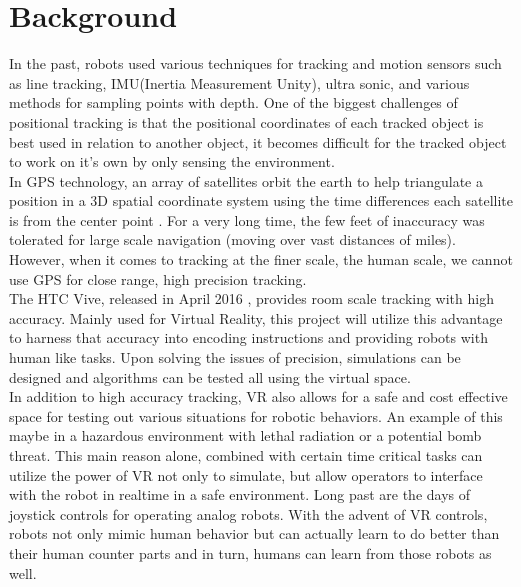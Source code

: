 \documentclass[10pt,a4paper]{article}
\begin{document}
	\section{Background}
	In the past, robots used various techniques for tracking and motion sensors such as line tracking, IMU(Inertia Measurement Unity), ultra sonic, and various methods for sampling points with depth. One of the biggest challenges of positional tracking is that the positional coordinates of each tracked object is best used in relation to another object, it becomes difficult for the tracked object to work on it's own by only sensing the environment.
	\\
	In GPS technology, an array of satellites orbit the earth to help triangulate a position in a 3D spatial coordinate system using the time differences each satellite is from the center point \cite{gizmodo1}. For a very long time, the few feet of inaccuracy was tolerated for large scale navigation (moving over vast distances of miles). However, when it comes to tracking at the finer scale, the human scale, we cannot use GPS for close range, high precision tracking.
	\\
	The HTC Vive, released in April 2016 \cite{techradar1}, provides room scale tracking with high accuracy. Mainly used for Virtual Reality, this project will utilize this advantage to harness that accuracy into encoding instructions and providing robots with human like tasks. Upon solving the issues of precision, simulations can be designed and algorithms can be tested all using the virtual space.
	\\
	In addition to high accuracy tracking, VR also allows for a safe and cost effective space for testing out various situations for robotic behaviors. An example of this maybe in a hazardous environment\cite{Bugalia} with lethal radiation or a potential bomb threat\cite{Codd-Downey}. This main reason alone, combined with certain time critical tasks can utilize the power of VR not only to simulate, but allow operators to interface with the robot in realtime in a safe environment. Long past are the days of joystick controls for operating analog robots. With the advent of VR controls, robots not only mimic human behavior but can actually learn to do better than their human counter parts and in turn, humans can learn from those robots as well.
	
\end{document}
